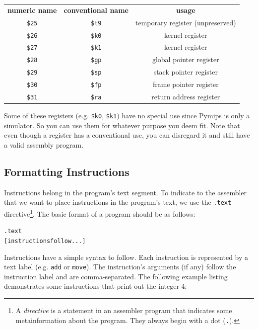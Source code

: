 \documentclass[12pt]{article}
\begin{document}
\begin{tabular}{c | c | c}
\textbf{numeric name} & \textbf{conventional name} & \textbf{usage}\\
    \hhline{=|=|=}
    \texttt{\$25} & \texttt{\$t9} & temporary register (unpreserved) \\ \hline
    \texttt{\$26} & \texttt{\$k0} & kernel register \\ \hline
    \texttt{\$27} & \texttt{\$k1} & kernel register \\ \hline
    \texttt{\$28} & \texttt{\$gp} & global pointer register \\ \hline
    \texttt{\$29} & \texttt{\$sp} & stack pointer register \\ \hline
    \texttt{\$30} & \texttt{\$fp} & frame pointer register \\ \hline
    \texttt{\$31} & \texttt{\$ra} & return address register \\ \hline
\end{tabular}

\vspace{0.1in} Some of these registers (e.g. \texttt{\$k0}, \texttt{\$k1}) have
     no special use since Pymips is only a simulator. So you can use them for
     whatever purpose you deem fit. Note that even though a register has a
     conventional use, you can disregard it and still have a valid assembly
     program.

\subsection{Formatting Instructions}

Instructions belong in the program's text segment. To indicate to the assembler
     that we want to place instructions in the program's text, we use the
     \texttt{.text} directive\footnote{A \textit{directive} is a statement in an
     assembler program that indicates some metainformation about the
     program. They always begin with a dot (\texttt{.}).}. The basic format of a
     program should be as follows:

\begin{alltt}
    .text
    [instructions follow...]
\end{alltt}

Instructions have a simple syntax to follow. Each instruction is represented by
     a text label (e.g. \texttt{add} or \texttt{move}). The instruction's
     arguments (if any) follow the instruction label and are
     comma-separated. The following example listing demonstrates some
     instructions that print out the integer 4:
\end{document}
